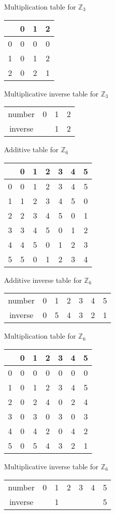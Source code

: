 \documentclass[10pt,\jkfside,a4paper]{article}
\begin{document}
\begin{enumerate}
Multiplication table for $\mathbb{Z}_3$
\begin{tabular}{c|c c c}
& 0 & 1 & 2\\
\hline
0 & 0 & 0 & 0\\
1 & 0 & 1 & 2\\
2 & 0 & 2 & 1\\
\end{tabular}

Multiplicative inverse table for $\mathbb{Z}_3$
\begin{tabular}{c|c c c}
number & 0 & 1 & 2\\
inverse & & 1 & 2\\
\end{tabular}

Additive table for $\mathbb{Z}_6$
\begin{tabular}{c|c c c c c c}
& 0 & 1 & 2 & 3 & 4 & 5\\
\hline
0 & 0 & 1 & 2 & 3 & 4 & 5\\
1 & 1 & 2 & 3 & 4 & 5 & 0\\
2 & 2 & 3 & 4 & 5 & 0 & 1\\
3 & 3 & 4 & 5 & 0 & 1 & 2\\
4 & 4 & 5 & 0 & 1 & 2 & 3\\
5 & 5 & 0 & 1 & 2 & 3 & 4\\
\end{tabular}

Additive inverse table for $\mathbb{Z}_6$
\begin{tabular}{c|c c c c c c}
number & 0 & 1 & 2 & 3 & 4 & 5\\
inverse & 0 & 5 & 4 & 3 & 2 & 1\\
\end{tabular}

Multiplication table for $\mathbb{Z}_6$
\begin{tabular}{c|c c c c c c}
& 0 & 1 & 2 & 3 & 4 & 5\\
\hline
0 & 0 & 0 & 0 & 0 & 0 & 0\\
1 & 0 & 1 & 2 & 3 & 4 & 5\\
2 & 0 & 2 & 4 & 0 & 2 & 4\\
3 & 0 & 3 & 0 & 3 & 0 & 3\\
4 & 0 & 4 & 2 & 0 & 4 & 2\\
5 & 0 & 5 & 4 & 3 & 2 & 1\\
\end{tabular}

Multiplicative inverse table for $\mathbb{Z}_6$
\begin{tabular}{c|c c c c c c}
number & 0 & 1 & 2 & 3 & 4 & 5\\
inverse & & 1 & & & & 5\\
\end{tabular}


\end{enumerate}
\end{document}
